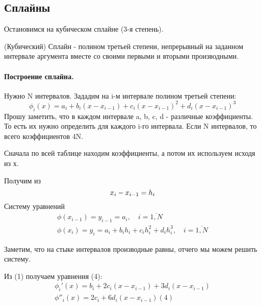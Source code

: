 

\title{}
\author{Козырнов Александр Дмитриевич, ИУ7-42Б}
\date{\today}


\subsection{Сплайны}


Остановимся на кубическом сплайне (3-я степень).

\begin{definition}
    (Кубический) Сплайн - полином третьей степени, непрерывный на заданном интервале
    аргумента вместе со своими первыми и вторыми производными.
\end{definition}

\medskip

\paragraph*{Построение сплайна.}
Нужно N интервалов. Зададим на i-м интервале полином третьей степени:
\begin{equation}
\phi_{i}(x) = a_{i} + b_{i}(x-x_{i-1}) + c_{i}(x-x_{i-1})^2 + d_{i}(x-x_{i-1})^3
\end{equation}
Прошу заметить, что в каждом интервале a, b, c, d - различные коэффициенты. То есть их нужно
определить для каждого i-го интервала. Если N интервалов, то всего коэффициентов 4N.

Сначала по всей таблице находим коэффициенты, а потом их используем исходя из х.

\medskip

Получим из
\[
x_{i}-x_{i-1} = h_{i}\\
\] 
Систему уравнений
\begin{gather}
\phi(x_{i-1}) = y_{i-1} = a_{i},\quad i = \overline{1,N}\\
\phi(x_{i}) = y_{i}= a_{i} + b_ih_i + c_ih_i^2 + d_ih_i^3,\quad i = \overline{1,N}
\end{gather}

Заметим, что на стыке интервалов производные равны, отчего мы можем решить систему.

Из (1) получаем уравнения (4):
\begin{gather*}
\phi_{i}'(x) = b_{i} + 2c_{i}(x-x_{i-1}) + 3d_{i}(x-x_{i-1})\\
\phi''_{i}(x) = 2c_{i} + 6d_{i}(x-x_{i-1})(4)\\
\end{gather*}

